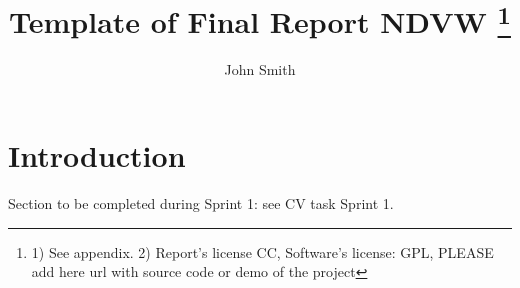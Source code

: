 \documentclass[preprint,12pt]{elsarticle}
\begin{document}
\begin{frontmatter}


\title{Template of Final Report NDVW \footnote{1) See appendix. 2) Report's license CC, Software's license: GPL, PLEASE add here url with source code or demo of the project} }





\author{John Smith}

\address{Spain}






\end{frontmatter}


\section{Introduction}
\label{S:1}

Section to be completed during Sprint 1: see CV task Sprint 1. 
\end{document}
